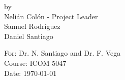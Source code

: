 \begin{titlepage}
\begin{center}
by \\[0.5cm]

Neli\'{a}n Col\'{o}n - Project Leader \\
Samuel Rodr\'{i}guez \\
Daniel Santiago \\

\vfill

For: Dr. N. Santiago and Dr. F. Vega \\
Course: ICOM 5047 \\
Date: \today






\end{center}

\end{titlepage}
